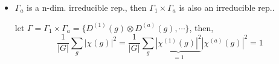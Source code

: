 \begin{itemize}
	\item $\Gamma_a$ is a n-dim. irreducible rep., then $\Gamma_1 \times \Gamma_a$ is also an irreducible rep..
	
	\begin{tcolorbox}[title=proof:]
		let $\Gamma = \Gamma_1 \times \Gamma_a = \{D^{(1)}(g) \otimes D^{(a)}(g), \cdots\}$, then,
		\begin{equation}
			\frac{1}{|G|} \sum_g |\chi(g)|^2 = \frac{1}{|G|} \sum_g \underbrace{|\chi^{(1)}(g)|^2}_{= 1} |\chi^{(a)}(g)|^2 = 1
		\end{equation}
	\end{tcolorbox}
\end{itemize}
